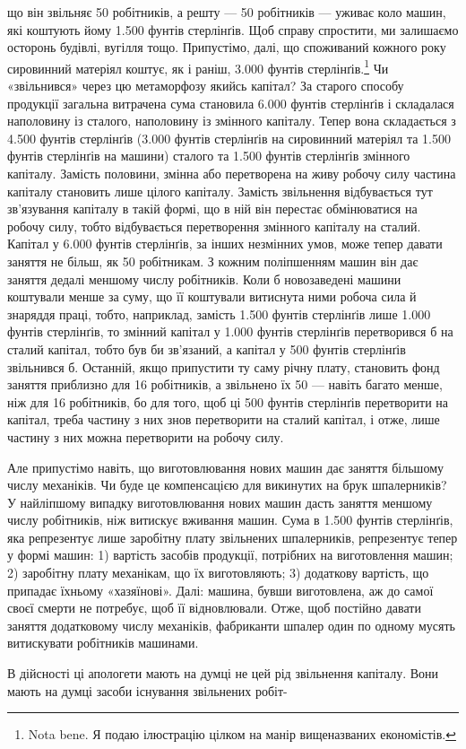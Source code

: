 що він звільняє 50 робітників, а решту — 50 робітників — уживає
коло машин, які коштують йому 1.500 фунтів стерлінґів. Щоб
справу спростити, ми залишаємо осторонь будівлі, вугілля тощо.
Припустімо, далі, що споживаний кожного року сировинний
матеріял коштує, як і раніш, 3.000 фунтів стерлінґів.\footnote{
Nota bene. Я подаю ілюстрацію цілком на манір вищеназваних
економістів.
} Чи
«звільнився» через цю метаморфозу якийсь капітал? За старого
способу продукції загальна витрачена сума становила 6.000 фунтів
стерлінґів і складалася наполовину із сталого, наполовину із
змінного капіталу. Тепер вона складається з 4.500 фунтів стерлінґів
(3.000 фунтів стерлінґів на сировинний матеріял та 1.500 фунтів
стерлінґів на машини) сталого та 1.500 фунтів стерлінґів змінного
капіталу. Замість половини, змінна або перетворена на живу робочу
силу частина капіталу становить лише цілого капіталу. Замість
звільнення відбувається тут зв’язування капіталу в такій формі,
що в ній він перестає обмінюватися на робочу силу, тобто відбувається
перетворення змінного капіталу на сталий. Капітал у 6.000
фунтів стерлінґів, за інших незмінних умов, може тепер давати заняття
не більш, як 50 робітникам. З кожним поліпшенням машин він
дає заняття дедалі меншому числу робітників. Коли б новозаведені
машини коштували менше за суму, що її коштували витиснута
ними робоча сила й знаряддя праці, тобто, наприклад, замість
1.500 фунтів стерлінґів лише 1.000 фунтів стерлінґів, то змінний
капітал у 1.000 фунтів стерлінґів перетворився б на сталий капітал,
тобто був би зв’язаний, а капітал у 500 фунтів стерлінґів
звільнився б. Останній, якщо припустити ту саму річну плату,
становить фонд заняття приблизно для 16 робітників, а звільнено
їх 50 — навіть багато менше, ніж для 16 робітників, бо для того,
щоб ці 500 фунтів стерлінґів перетворити на капітал, треба частину
з них знов перетворити на сталий капітал, і отже, лише частину
з них можна перетворити на робочу силу.

Але припустімо навіть, що виготовлювання нових машин дає
заняття більшому числу механіків. Чи буде це компенсацією
для викинутих на брук шпалерників? У найліпшому випадку
виготовлювання нових машин дасть заняття меншому числу
робітників, ніж витискує вживання машин. Сума в 1.500 фунтів
стерлінґів, яка репрезентує лише заробітну плату звільнених
шпалерників, репрезентує тепер у формі машин: 1) вартість засобів
продукції, потрібних на виготовлення машин; 2) заробітну
плату механікам, що їх виготовляють; 3) додаткову вартість, що
припадає їхньому «хазяїнові». Далі: машина, бувши виготовлена,
аж до самої своєї смерти не потребує, щоб її відновлювали. Отже,
щоб постійно давати заняття додатковому числу механіків, фабриканти
шпалер один по одному мусять витискувати робітників
машинами.

В дійсності ці апологети мають на думці не цей рід звільнення
капіталу. Вони мають на думці засоби існування звільнених робіт-
